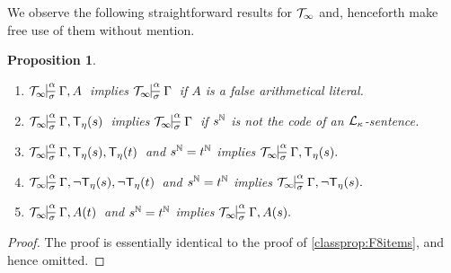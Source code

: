 \documentclass[UKenglish,cleveref,DIV=12]{scrartcl}
\newtheorem{proposition}[lemma]{Proposition}
\theoremstyle{definition}
\theoremstyle{definition}
\begin{document}
We observe the following straightforward results for $\mathcal{T}_\infty$ and,
henceforth make free use of them without mention.
\begin{proposition}\label{extprop:T8prop1}\label{extprop:T8items}\
 \begin{enumerate}
  \item $\Tinfty\prov{\alpha}{\sigma}{\Gamma, A}$ implies
	$\Tinfty\prov{\alpha}{\sigma}{\Gamma}$ if $A$ is a false arithmetical literal.
	\label{extlem:F8L1itemvi}
  \item $\Tinfty\prov{\alpha}{\sigma}{\Gamma, \T_\eta(s)}$ implies
	$\Tinfty\prov{\alpha}\sigma{\Gamma}$ if $s^{\mathbb N}$ is not the code of an $\mathcal{L}_\kappa$-sentence.\label{extlem:F8L1itemviji}
  \item $\Tinfty\prov{\alpha}\sigma{\Gamma, \T_\eta(s), \T_\eta(t)}$ and
	$s^{\mathbb N}=t^{\mathbb N}$ implies
	$\Tinfty\prov{\alpha}\sigma{\Gamma,\T_\eta(s).}$\label{extlem:F8L1itemx}
  \item $\Tinfty\prov{\alpha}\sigma{\Gamma,\lnot \T_\eta(s), \lnot \T_\eta(t)}$ and
	$s^{\mathbb N}=t^{\mathbb N}$ implies
	$\Tinfty\prov{\alpha}\sigma{\Gamma,\lnot \T_\eta(s).}$\label{extlem:F8L1itemxi}
  \item $\Tinfty\prov{\alpha}\sigma{\Gamma, A(t)}$ and $s^{\mathbb N}=t^{\mathbb N}$ implies
	$\Tinfty\prov{\alpha}\sigma{\Gamma,A(s).}$\label{extlem:F8L1itemix}
\end{enumerate}
\end{proposition}
\begin{proof}
 The proof is essentially identical to the proof of \cref{classprop:F8items},
  and hence omitted.
\end{proof}
\end{document}
